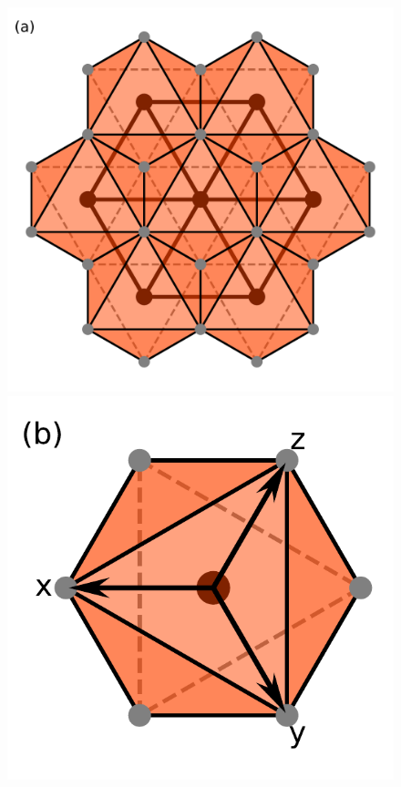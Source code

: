 \documentclass[aps,prb,reprint,amsfonts,amsmath,amssymb,showpacs,groupedaddress,superscriptaddress]{revtex4-1}
\begin{document}
\begin{figure}
    \centering
    \begin{minipage}{0.6\columnwidth}
        \includegraphics[width=\linewidth]{fig/EdgeSharingOctahedrons.pdf}
    \end{minipage}\hspace{0pt}
    \begin{minipage}{0.3\columnwidth}
        \includegraphics[width=\linewidth]{fig/SingleOctahedron.pdf}\vspace{0pt}

\end{minipage}
\end{figure}
\end{document}

